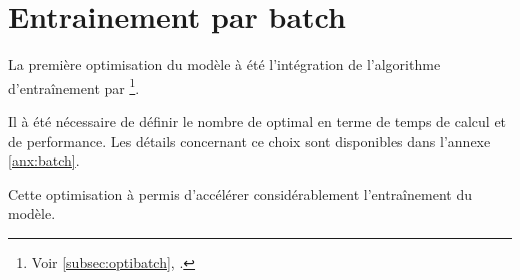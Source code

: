 \section{Entrainement par batch}
La première optimisation du modèle à été l'intégration de l'algorithme d'entraînement par \footnote{Voir \autoref{subsec:optibatch}, .}.

Il à été nécessaire de définir le nombre de  optimal en terme de temps de calcul et de performance. Les détails concernant ce choix sont disponibles dans l'annexe \ref{anx:batch}.

Cette optimisation à permis d'accélérer considérablement l'entraînement du modèle.